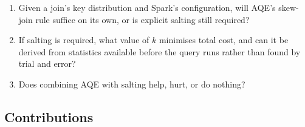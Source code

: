 \begin{enumerate}
\item Given a join's key distribution and Spark's configuration, will AQE's
skew-join rule suffice on its own, or is explicit salting still required?
\item If salting is required, what value of $k$ minimises total cost, and can
it be derived from statistics available before the query runs rather than found
by trial and error?
\item Does combining AQE with salting help, hurt, or do nothing?
\end{enumerate}

\subsection{Contributions}

